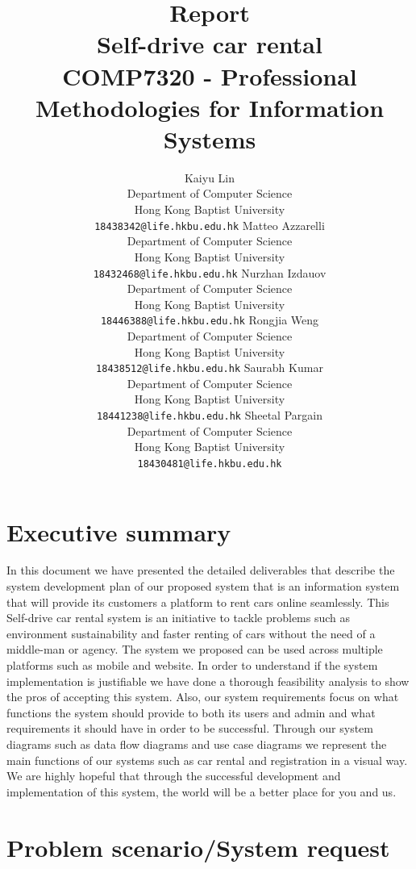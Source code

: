 \documentclass{article}
\title{Report\\Self-drive car rental\\ \large{COMP7320 - Professional Methodologies for Information Systems}}
\author{
    Kaiyu Lin\\
    Department of Computer Science\\
    Hong Kong Baptist University\\
    \texttt{18438342@life.hkbu.edu.hk}
    \And
    Matteo Azzarelli\\
    Department of Computer Science\\
    Hong Kong Baptist University\\
    \texttt{18432468@life.hkbu.edu.hk}
    \And
    Nurzhan Izdauov\\
    Department of Computer Science\\
    Hong Kong Baptist University\\
    \texttt{18446388@life.hkbu.edu.hk}
    \And
    Rongjia Weng\\
    Department of Computer Science\\
    Hong Kong Baptist University\\
    \texttt{18438512@life.hkbu.edu.hk}
    \And
    Saurabh Kumar\\
    Department of Computer Science\\
    Hong Kong Baptist University\\
    \texttt{18441238@life.hkbu.edu.hk}
    \And
    Sheetal Pargain\\
    Department of Computer Science\\
    Hong Kong Baptist University\\
    \texttt{18430481@life.hkbu.edu.hk}
}
\begin{document}
\maketitle

\newpage





\section{Executive summary}
    In this document we have presented the detailed deliverables that describe the system development plan of our proposed system that is an information system that will provide its customers a platform to rent cars online seamlessly. This Self-drive car rental system is an initiative to tackle problems such as environment sustainability and faster renting of cars without the need of a middle-man or agency. The system we proposed can be used across multiple platforms such as mobile and website. In order to understand if the system implementation is justifiable we have done a thorough feasibility analysis to show the pros of accepting this system. Also, our system requirements focus on what functions the system should provide to both its users and admin and what requirements it should have in order to be successful. Through our system diagrams such as data flow diagrams and use case diagrams we represent the main functions of our systems such as car rental and registration in a visual way. We are highly hopeful that through the successful development and implementation of this system, the world will be a better place for you and us.
    
\section{Problem scenario/System request}
\end{document}
